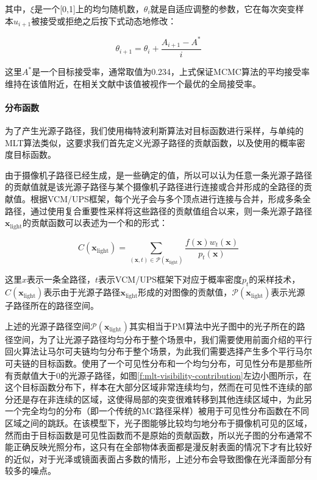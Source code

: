 \noindent 其中，$\xi$是一个[0,1]上的均匀随机数，$\theta_i$就是自适应调整的参数，它在每次突变样本$u_{i+1}$被接受或拒绝之后按下式动态地修改：

\begin{equation}
	\theta_{i+1}=\theta_i+\frac{A_{i+1}-A^{*}}{i}
\end{equation}

\noindent 这里$A^{*}$是一个目标接受率，通常取值为0.234，上式保证MCMC算法的平均接受率维持在该值附近，在相关文献中\cite{a:Weakconvergenceandoptimalscalingofrandomwalkmetropolisalgorithms}该值被视作一个最优的全局接受率。




\paragraph{分布函数}
为了产生光源子路径，我们使用梅特波利斯算法对目标函数进行采样，与单纯的MLT算法类似，这要求我们首先定义光源子路径的贡献函数，以及使用的概率密度目标函数。

由于摄像机子路径已经生成，是一些确定的值，所以可以认为任意一条光源子路径的贡献值就是该光源子路径与某个摄像机子路径进行连接或合并形成的全路径的贡献值。根据VCM/UPS框架，每个光子会与多个顶点进行连接与合并，形成多条全路径，通过使用复合重要性采样将这些路径的贡献值组合以来，则一条光源子路径${\mathbf{x}}_{\text{light}}$的贡献函数可以表述为一个和的形式：

\begin{equation}
	C({\mathbf{x}}_{\text{light}})=\sum_{({\mathbf{x}},t)\in\mathcal{P}({\mathbf{x}}_{\text{light}})}\frac{f({\mathbf{x}})w_t({\mathbf{x}})}{p_t({\mathbf{x}})}
\end{equation}

\noindent 这里${x}$表示一条全路径，$t$表示VCM/UPS框架下对应于概率密度$p_t$的采样技术，$C({\mathbf{x}}_{\text{light}})$表示由于光源子路径${\mathbf{x}}_{\text{light}}$形成的对图像的贡献值，$\mathcal{P}({\mathbf{x}}_{\text{light}})$表示光源子路径所在的路径空间。

上述的光源子路径空间$\mathcal{P}({\mathbf{x}}_{\text{light}})$其实相当于PM算法中光子图中的光子所在的路径空间，为了让光源子路径均匀分布于整个场景中，我们需要使用前面介绍的平行回火算法让马尔可夫链均匀分布于整个场景，为此我们需要选择产生多个平行马尔可夫链的目标函数。\cite{a:RobustAdaptivePhotonTracingusingPhotonPathVisibility}使用了一个可见性分布和一个均匀分布，可见性分布是那些所有贡献值大于0的光源子路径，如图\ref{f:mlt-visibility-contribution}左边小图所示，在这个目标函数分布下，样本在大部分区域非常连续均匀，然而在可见性不连续的部分还是存在非连续的区域，这使得局部的突变很难转移到其他连续区域中，为此另一个完全均匀的分布（即一个传统的MC路径采样）被用于可见性分布函数在不同区域之间的跳跃。在该模型下，光子图能够比较均匀地分布于摄像机可见的区域，然而由于目标函数是可见性函数而不是原始的贡献函数，所以光子图的分布通常不能正确反映光照分布，这只有在全部物体表面都是漫反射表面的情况下才有比较好的近似，对于光泽或镜面表面占多数的情形，上述分布会导致图像在光泽面部分有较多的噪点。

